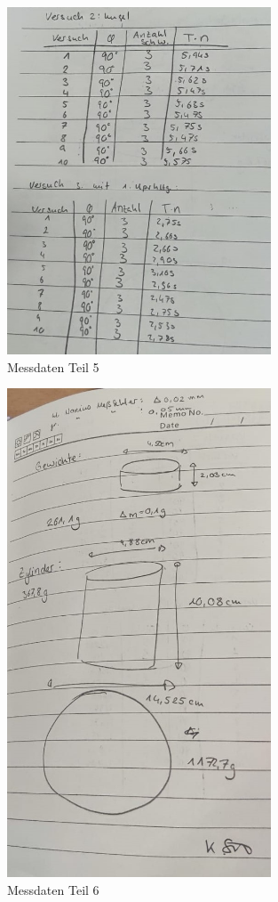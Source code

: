 \begin{figure}
  \centering
  \includegraphics[width=0.7\textwidth]{index5.jpg}
  \caption{Messdaten Teil 5}
  \label{fig:M1}
\end{figure}

\begin{figure}
  \centering
  \includegraphics[width=0.7\textwidth]{index6.jpg}
  \caption{Messdaten Teil 6}
  \label{fig:M1}
\end{figure}